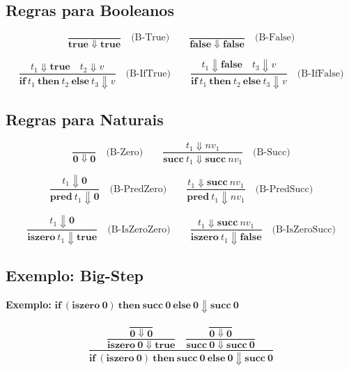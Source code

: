 \subsection{Regras para Booleanos}

\[
  \frac{}{\mathbf{true} \Downarrow \mathbf{true}} \quad\text{(B-True)}
  \qquad
  \frac{}{\mathbf{false} \Downarrow \mathbf{false}} \quad\text{(B-False)}
\]

\[
  \frac{t_1 \Downarrow \mathbf{true} \quad t_2 \Downarrow v}
  {\mathbf{if}\ t_1\ \mathbf{then}\ t_2\ \mathbf{else}\ t_3 \Downarrow v}
  \quad\text{(B-IfTrue)}
  \qquad
  \frac{t_1 \Downarrow \mathbf{false} \quad t_3 \Downarrow v}
  {\mathbf{if}\ t_1\ \mathbf{then}\ t_2\ \mathbf{else}\ t_3 \Downarrow v}
  \quad\text{(B-IfFalse)}
\]

\subsection{Regras para Naturais}

\[
  \frac{}{\mathbf{0} \Downarrow \mathbf{0}} \quad\text{(B-Zero)}
  \qquad
  \frac{t_1 \Downarrow nv_1}{\mathbf{succ}\ t_1 \Downarrow
  \mathbf{succ}\ nv_1} \quad\text{(B-Succ)}
\]

\[
  \frac{t_1 \Downarrow \mathbf{0}}{\mathbf{pred}\ t_1 \Downarrow
  \mathbf{0}} \quad\text{(B-PredZero)}
  \qquad
  \frac{t_1 \Downarrow \mathbf{succ}\ nv_1}{\mathbf{pred}\ t_1
  \Downarrow nv_1} \quad\text{(B-PredSucc)}
\]

\[
  \frac{t_1 \Downarrow \mathbf{0}}{\mathbf{iszero}\ t_1 \Downarrow
  \mathbf{true}} \quad\text{(B-IsZeroZero)}
  \qquad
  \frac{t_1 \Downarrow \mathbf{succ}\ nv_1}{\mathbf{iszero}\ t_1
  \Downarrow \mathbf{false}} \quad\text{(B-IsZeroSucc)}
\]

\subsection{Exemplo: Big-Step}

\textbf{Exemplo:}
\(\mathbf{if}\ (\mathbf{iszero}\ \mathbf{0})\ \mathbf{then}\ \mathbf{succ}\ \mathbf{0}\ \mathbf{else}\ \mathbf{0}
\Downarrow \mathbf{succ}\ \mathbf{0}\)

\[
  \dfrac{
    \dfrac{
      \dfrac{}{\mathbf{0} \Downarrow \mathbf{0}}
    }{\mathbf{iszero}\ \mathbf{0} \Downarrow \mathbf{true}}
    \quad
    \dfrac{
      \dfrac{}{\mathbf{0} \Downarrow \mathbf{0}}
    }{\mathbf{succ}\ \mathbf{0} \Downarrow \mathbf{succ}\ \mathbf{0}}
  }{
    \mathbf{if}\ (\mathbf{iszero}\ \mathbf{0})\ \mathbf{then}\ \mathbf{succ}\ \mathbf{0}\ \mathbf{else}\ \mathbf{0}
    \Downarrow \mathbf{succ}\ \mathbf{0}
  }
\]

